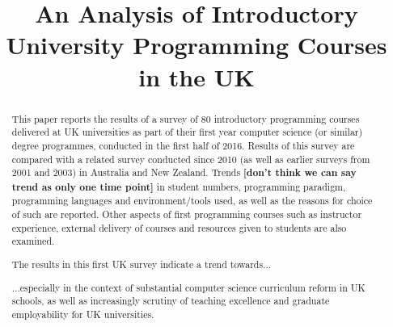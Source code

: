 \documentclass{sig-alternate}
\begin{document}
%

\title{An Analysis of Introductory University Programming Courses in the UK}
\iffalse
\numberofauthors{3}
\author{
\alignauthor
Ellen Murphy\\
\affaddr{Institute for\\Mathematical Innovation}\\
\affaddr{University of Bath}\\
\affaddr{e.murphy@bath.ac.uk}
\alignauthor
Tom Crick\\
\affaddr{Dept. of Computing}\\
\affaddr{Cardiff Metropolitan University}\\
\affaddr{tcrick@cardiffmet.ac.uk}
\alignauthor
James H. Davenport\\
\affaddr{Dept. of Computer Science}\\
\affaddr{University of Bath}\\
\affaddr{j.h.davenport@bath.ac.uk}\\
}
\fi
\maketitle

\begin{abstract}
This paper reports the results of a survey of 80 introductory
programming courses delivered at UK universities as part of their
first year computer science (or similar) degree programmes, conducted
in the first half of 2016. Results of this survey are compared with a
related survey conducted since 2010 (as well as earlier surveys from
2001 and 2003)  in Australia and New Zealand. Trends {\bf{[don't think we can say trend as only one time point]}} in
student numbers, programming paradigm, programming languages and
environment/tools used, as well as the reasons for choice of such are
reported. Other aspects of first programming courses such as
instructor experience, external delivery of courses and resources
given to students are also examined.

The results in this first UK survey indicate a trend towards...

...especially in the context of substantial computer science
curriculum reform in UK schools, as well as increasingly scrutiny of
teaching excellence and graduate employability for UK universities.
\end{abstract}
\end{document}
